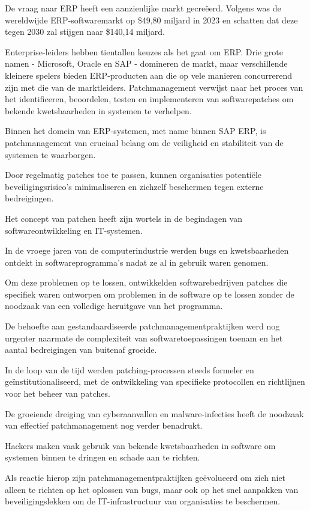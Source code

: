 De vraag naar ERP heeft een aanzienlijke markt gecreëerd.
 Volgens \textcite{Madh2024} was de wereldwijde ERP-softwaremarkt op \$49,80 miljard in 2023 en schatten dat deze tegen 2030 zal stijgen naar \$140,14 miljard.

Enterprise-leiders hebben tientallen keuzes als het gaat om ERP.
 Drie grote namen - Microsoft, Oracle en SAP - domineren de markt, maar verschillende kleinere spelers bieden ERP-producten aan die op vele manieren concurrerend zijn met die van de marktleiders.
 \autocite{Pratt2023}
Patchmanagement verwijst naar het proces van het identificeren, beoordelen, testen en implementeren van softwarepatches om bekende kwetsbaarheden in systemen te verhelpen.
 
Binnen het domein van ERP-systemen, met name binnen SAP ERP, is patchmanagement van cruciaal belang om de veiligheid en stabiliteit van de systemen te waarborgen.

 Door regelmatig patches toe te passen, kunnen organisaties potentiële beveiligingsrisico's minimaliseren en zichzelf beschermen tegen externe bedreigingen.


Het concept van patchen heeft zijn wortels in de begindagen van softwareontwikkeling en IT-systemen.

 In de vroege jaren van de computerindustrie werden bugs en kwetsbaarheden ontdekt in softwareprogramma's nadat ze al in gebruik waren genomen.

 Om deze problemen op te lossen, ontwikkelden softwarebedrijven patches die specifiek waren ontworpen om problemen in de software op te lossen zonder de noodzaak van een volledige heruitgave van het programma.

 \autocite{Buenning2024}
De behoefte aan gestandaardiseerde patchmanagementpraktijken werd nog urgenter naarmate de complexiteit van softwaretoepassingen toenam en het aantal bedreigingen van buitenaf groeide.

 In de loop van de tijd werden patching-processen steeds formeler en geïnstitutionaliseerd, met de ontwikkeling van specifieke protocollen en richtlijnen voor het beheer van patches.

 
De groeiende dreiging van cyberaanvallen en malware-infecties heeft de noodzaak van effectief patchmanagement nog verder benadrukt.

 Hackers maken vaak gebruik van bekende kwetsbaarheden in software om systemen binnen te dringen en schade aan te richten.

 Als reactie hierop zijn patchmanagementpraktijken geëvolueerd om zich niet alleen te richten op het oplossen van bugs, maar ook op het snel aanpakken van beveiligingslekken om de IT-infrastructuur van organisaties te beschermen.




